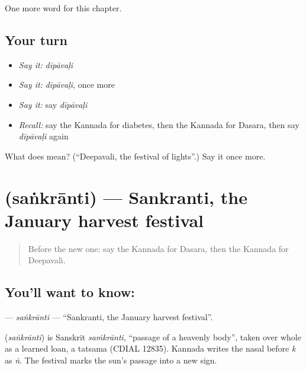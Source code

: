 \begin{grammarlens}[title={What you've built}]
One more word for this chapter.
\end{grammarlens}

\subsection*{Your turn}
\begin{itemize}
\raggedright
  \item \emph{Say it:} \emph{dīpāvaḷi}
  \item \emph{Say it:} \emph{dīpāvaḷi}, once more
  \item \emph{Say it:} say \emph{dīpāvaḷi}
  \item \emph{Recall:} say the Kannada for diabetes, then the Kannada for Dasara, then say \emph{dīpāvaḷi} again
\end{itemize}

\begin{tcolorbox}[breakable,colback=teal!4,colframe=teal!35!black,title={Before you move on}]
What does  mean? (\textquotedblleft{}Deepavali, the festival of lights\textquotedblright{}.) Say it once more.
\end{tcolorbox}
\section[\texorpdfstring{\kn{ಸಂಕ್ರಾಂತಿ} (saṅkrānti)}{ಸಂಕ್ರಾಂತಿ (saṅkrānti)}]{ (saṅkrānti) — Sankranti, the January harvest festival}

\label{lesson:KA-C247-sankranti}



\begin{quote}
Before the new one: say the Kannada for Dasara, then the Kannada for Deepavali.
\end{quote}

\subsection*{You'll want to know: }
\textbf{} — \emph{saṅkrānti} — \textquotedblleft{}Sankranti, the January harvest festival\textquotedblright{}.

\begin{cousinweb}
\textbf{} (\emph{saṅkrānti}) is Sanskrit \emph{saṁkrānti}, \textquotedblleft{}passage of a heavenly body\textquotedblright{}, taken over whole as a learned loan, a tatsama (CDIAL 12835). Kannada writes the nasal before \emph{k} as \emph{ṅ}. The festival marks the sun's passage into a new sign.
\end{cousinweb}


